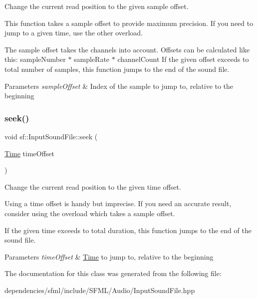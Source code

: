 Change the current read position to the given sample offset. 

This function takes a sample offset to provide maximum precision. If you need to jump to a given time, use the other overload.

The sample offset takes the channels into account. Offsets can be calculated like this\+: {\ttfamily sample\+Number $\ast$ sample\+Rate $\ast$ channel\+Count} If the given offset exceeds to total number of samples, this function jumps to the end of the sound file.


\begin{DoxyParams}{Parameters}
{\em sample\+Offset} & Index of the sample to jump to, relative to the beginning \\
\hline
\end{DoxyParams}
\mbox{\label{classsf_1_1_input_sound_file_a8eee7af58ad75ddc61f93ad72e2d66c1}} 
\subsubsection{\texorpdfstring{seek()}{seek()}\hspace{0.1cm}{\footnotesize\ttfamily [2/2]}}
{\footnotesize\ttfamily void sf\+::\+Input\+Sound\+File\+::seek (\begin{DoxyParamCaption}\item[{\hyperlink{classsf_1_1_time}{Time}}]{time\+Offset }\end{DoxyParamCaption})}



Change the current read position to the given time offset. 

Using a time offset is handy but imprecise. If you need an accurate result, consider using the overload which takes a sample offset.

If the given time exceeds to total duration, this function jumps to the end of the sound file.


\begin{DoxyParams}{Parameters}
{\em time\+Offset} & \hyperlink{classsf_1_1_time}{Time} to jump to, relative to the beginning \\
\hline
\end{DoxyParams}


The documentation for this class was generated from the following file\+:\begin{DoxyCompactItemize}
\item 
dependencies/sfml/include/\+S\+F\+M\+L/\+Audio/Input\+Sound\+File.\+hpp\end{DoxyCompactItemize}
